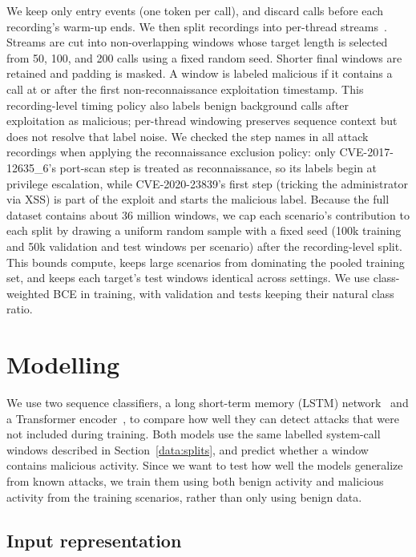 \documentclass{article}
\begin{document}
We keep only entry events (one token per call), and discard calls before each recording's warm-up ends. We then split recordings into per-thread streams~\citep{grimmer2021thread}. Streams are cut into non-overlapping windows whose target length is selected from 50, 100, and 200 calls using a fixed random seed. Shorter final windows are retained and padding is masked. A window is labeled malicious if it contains a call at or after the first non-reconnaissance exploitation timestamp. This recording-level timing policy also labels benign background calls after exploitation as malicious; per-thread windowing preserves sequence context but does not resolve that label noise. We checked the step names in all attack recordings when applying the reconnaissance exclusion policy: only CVE-2017-12635\_6's port-scan step is treated as reconnaissance, so its labels begin at privilege escalation, while CVE-2020-23839's first step (tricking the administrator via XSS) is part of the exploit and starts the malicious label. Because the full dataset contains about 36 million windows, we cap each scenario's contribution to each split by drawing a uniform random sample with a fixed seed (100k training and 50k validation and test windows per scenario) after the recording-level split. This bounds compute, keeps large scenarios from dominating the pooled training set, and keeps each target's test windows identical across settings. We use class-weighted BCE in training, with validation and tests keeping their natural class ratio.

\section{Modelling}
\label{sec:modelling}

We use two sequence classifiers, a long short-term memory
(LSTM) network~\citep{hochreiter1997lstm} and a Transformer
encoder~\citep{vaswani2017attention}, to compare how well
they can detect attacks that were not included during
training. Both models use the same labelled system-call
windows described in Section~\ref{data:splits}, and predict
whether a window contains malicious activity. Since we want
to test how well the models generalize from known attacks,
we train them using both benign activity and malicious
activity from the training scenarios, rather than only
using benign data.

\subsection{Input representation}
\label{model:input}
\end{document}
